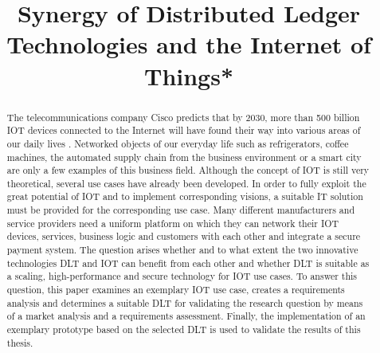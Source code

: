 \documentclass[conference]{IEEEtran}
\begin{document}
\title{Synergy of Distributed Ledger Technologies and the Internet of Things*\\
}

\author{
}

\maketitle

\begin{abstract}
  The telecommunications company Cisco predicts that by 2030, more than 500 billion IOT devices connected to the Internet will have found their way into various areas of our daily lives \cite{cisco2016}. Networked objects of our everyday life such as refrigerators, coffee machines, the automated supply chain from the business environment or a smart city are only a few examples of this business field. Although the concept of IOT is still very theoretical, several use cases have already been developed. In order to fully exploit the great potential of IOT and to implement corresponding visions, a suitable IT solution must be provided for the corresponding use case. Many different manufacturers and service providers need a uniform platform on which they can network their IOT devices, services, business logic and customers with each other and integrate a secure payment system. The question arises whether and to what extent the two innovative technologies DLT and IOT can benefit from each other and whether DLT is suitable as a scaling, high-performance and secure technology for IOT use cases. To answer this question, this paper examines an exemplary IOT use case, creates a requirements analysis and determines a suitable DLT for validating the research question by means of a market analysis and a requirements assessment. Finally, the implementation of an exemplary prototype based on the selected DLT is used to validate the results of this thesis.
\end{abstract}
\end{document}
